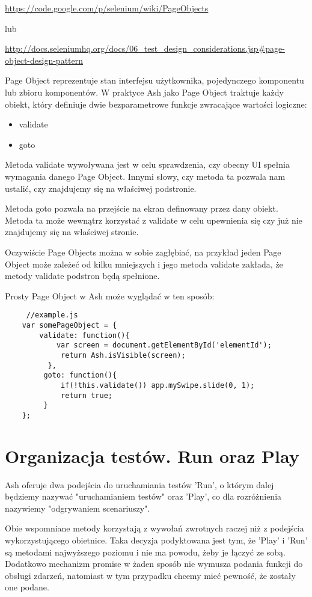 \documentclass[brudnopis]{xmgr}
\begin{document}
\url{https://code.google.com/p/selenium/wiki/PageObjects}

lub

\url{http://docs.seleniumhq.org/docs/06\_test\_design\_considerations.jsp\#page-object-design-pattern}

Page Object reprezentuje stan interfejsu użytkownika, pojedynczego komponentu lub zbioru komponentów. W praktyce Ash jako Page Object traktuje każdy obiekt, który definiuje dwie bezparametrowe funkcje zwracające wartości logiczne:

\begin{itemize}
  \item validate
  \item goto
\end{itemize}

Metoda validate wywoływana jest w celu sprawdzenia, czy obecny UI spełnia wymagania danego Page Object. Innymi słowy, czy metoda ta pozwala nam ustalić, czy znajdujemy się na właściwej podstronie. 

Metoda goto pozwala na przejście na ekran definowany przez dany obiekt. Metoda ta może wewnątrz korzystać z validate w celu upewnienia się czy już nie znajdujemy się na właściwej stronie. 

Oczywiście Page Objects można w sobie zagłębiać, na przykład jeden Page Object może zależeć od kilku mniejszych i jego metoda validate zakłada, że metody validate podstron będą spełnione. 

Prosty Page Object w Ash może wyglądać w ten sposób:

\begin{lstlisting}
     //example.js
    var somePageObject = {
    	validate: function(){
      	    var screen = document.getElementById('elementId');
             return Ash.isVisible(screen);
          },
         goto: function(){
             if(!this.validate()) app.mySwipe.slide(0, 1);
             return true;
         }
    };
\end{lstlisting}

\section{Organizacja testów. Run oraz Play}

Ash oferuje dwa podejścia do uruchamiania testów 'Run', o którym dalej będziemy nazywać "uruchamianiem testów" oraz 'Play', co dla rozróżnienia nazywiemy "odgrywaniem scenariuszy".

Obie wspomniane metody korzystają z wywołań zwrotnych raczej niż z podejścia wykorzystującego obietnice. Taka decyzja podyktowana jest tym, że 'Play' i 'Run' są  metodami najwyższego poziomu i nie ma powodu, żeby je łączyć ze sobą. Dodatkowo mechanizm promise w żaden sposób nie wymusza podania funkcji do obsługi zdarzeń, natomiast w tym przypadku chcemy mieć pewność, że zostały one podane.  
\end{document}
